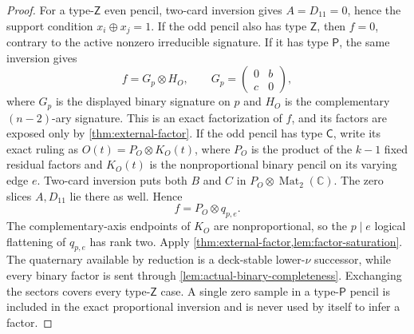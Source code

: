 \documentclass[11pt,letterpaper,onecolumn]{article}
\theoremstyle{plain}
\theoremstyle{definition}
\theoremstyle{remark}
\newcommand{\Mat}{\operatorname{Mat}}
\begin{document}
\begin{proof}
For a type-\(\mathsf Z\) even pencil, two-card inversion gives \(A=D_{11}=0\), hence the
support condition \(x_i\oplus x_j=1\).  If the odd pencil also has type
\(\mathsf Z\), then \(f=0\), contrary to the active nonzero irreducible signature.  If it has type
\(\mathsf P\), the same inversion gives
\begin{equation*}
 f=G_p\otimes H_O,
  \qquad
  G_p=\begin{pmatrix}0&b\\ c&0\end{pmatrix},
\end{equation*}
where \(G_p\) is the displayed binary signature on \(p\) and \(H_O\) is the
complementary \((n-2)\)-ary signature.  This is an exact factorization of \(f\), and its factors
are exposed only by \cref{thm:external-factor}.  If the odd pencil has type
\(\mathsf C\), write its exact ruling as \(O(t)=P_O\otimes K_O(t)\), where \(P_O\)
is the product of the \(k-1\) fixed residual factors and \(K_O(t)\) is the
nonproportional binary pencil on its varying edge \(e\).  Two-card inversion
puts both \(B\) and \(C\) in \(P_O\otimes\Mat_2(\mathbb C)\). The zero
slices \(A,D_{11}\) lie there as well.  Hence
\[
 f=P_O\otimes q_{p,e}.
\]
The complementary-axis endpoints of \(K_O\) are nonproportional, so the
\(p\mid e\) logical flattening of \(q_{p,e}\) has rank two.  Apply
    \cref{thm:external-factor,lem:factor-saturation}. The quaternary available by reduction is a
deck-stable lower-\(\nu\) successor, while every binary factor is sent through
\cref{lem:actual-binary-completeness}.  Exchanging the sectors covers every
type-\(\mathsf Z\) case.  A single zero sample in a type-\(\mathsf P\) pencil is included in
the exact proportional inversion and is never used by itself to infer a
factor.


\end{proof}
\end{document}

